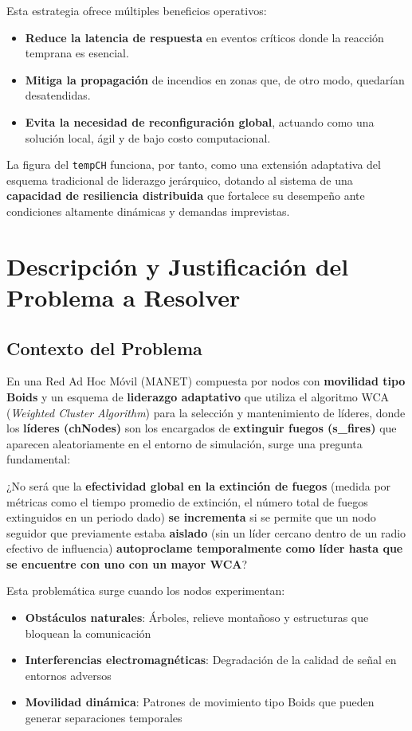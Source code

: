 \documentclass{article}
\begin{document}
Esta estrategia ofrece múltiples beneficios operativos:
\begin{itemize}
    \item \textbf{Reduce la latencia de respuesta} en eventos críticos donde la reacción temprana es esencial.
    \item \textbf{Mitiga la propagación} de incendios en zonas que, de otro modo, quedarían desatendidas.
    \item \textbf{Evita la necesidad de reconfiguración global}, actuando como una solución local, ágil y de bajo costo computacional.
\end{itemize}

La figura del \texttt{tempCH} funciona, por tanto, como una extensión adaptativa del esquema tradicional de liderazgo jerárquico, dotando al sistema de una \textbf{capacidad de resiliencia distribuida} que fortalece su desempeño ante condiciones altamente dinámicas y demandas imprevistas.



\section{Descripción y Justificación del Problema a Resolver}\label{sec:descr}

\subsection{Contexto del Problema}
En una Red Ad Hoc Móvil (MANET) compuesta por nodos con \textbf{movilidad tipo Boids} y un esquema de \textbf{liderazgo adaptativo} que utiliza el algoritmo WCA (\textit{Weighted Cluster Algorithm}) para la selección y mantenimiento de líderes, donde los \textbf{líderes (chNodes)} son los encargados de \textbf{extinguir fuegos (s\_fires)} que aparecen aleatoriamente en el entorno de simulación, surge una pregunta fundamental:

¿No será que la \textbf{efectividad global en la extinción de fuegos} (medida por métricas como el tiempo promedio de extinción, el número total de fuegos extinguidos en un periodo dado) \textbf{se incrementa} si se permite que un nodo seguidor que previamente estaba \textbf{aislado} (sin un líder cercano dentro de un radio efectivo de influencia) \textbf{autoproclame temporalmente como líder hasta que se encuentre con uno con un mayor WCA}?

Esta problemática surge cuando los nodos experimentan:
\begin{itemize}
    \item \textbf{Obstáculos naturales}: Árboles, relieve montañoso y estructuras que bloquean la comunicación
    \item \textbf{Interferencias electromagnéticas}: Degradación de la calidad de señal en entornos adversos
    \item \textbf{Movilidad dinámica}: Patrones de movimiento tipo Boids que pueden generar separaciones temporales
\end{itemize}
\end{document}
